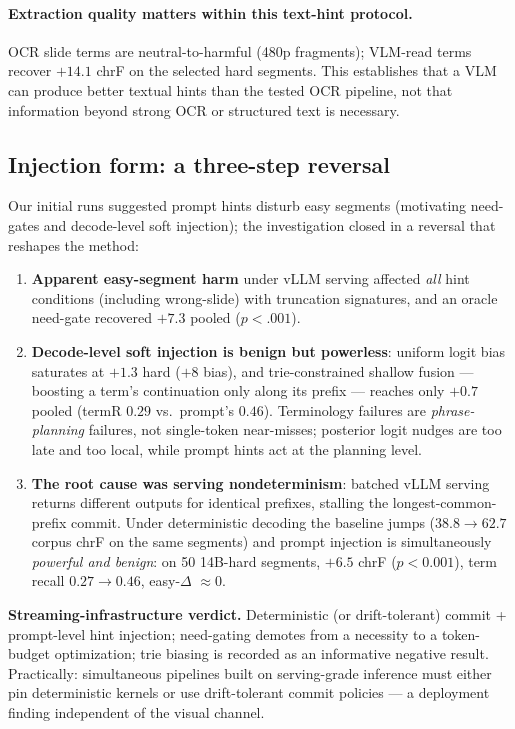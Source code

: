 \paragraph{Extraction quality matters within this text-hint protocol.} OCR
slide terms are neutral-to-harmful (480p fragments); VLM-read terms recover
$+14.1$ chrF on the selected hard segments. This establishes that a VLM can
produce better textual hints than the tested OCR pipeline, not that information
beyond strong OCR or structured text is necessary.

\subsection{Injection form: a three-step reversal}
\label{sec:injection-form}

Our initial runs suggested prompt hints disturb easy segments (motivating
need-gates and decode-level soft injection); the investigation closed in a
reversal that reshapes the method:

\begin{enumerate}[leftmargin=*]
\item \textbf{Apparent easy-segment harm} under vLLM serving affected
  \emph{all} hint conditions (including wrong-slide) with truncation
  signatures, and an oracle need-gate recovered $+7.3$ pooled ($p{<}.001$).
\item \textbf{Decode-level soft injection is benign but powerless}: uniform
  logit bias saturates at $+1.3$ hard ($+8$ bias), and trie-constrained
  shallow fusion --- boosting a term's continuation only along its prefix ---
  reaches only $+0.7$ pooled (termR $0.29$ vs.\ prompt's $0.46$).
  Terminology failures are \emph{phrase-planning} failures, not single-token
  near-misses; posterior logit nudges are too late and too local, while prompt
  hints act at the planning level.
\item \textbf{The root cause was serving nondeterminism}: batched vLLM serving
  returns different outputs for identical prefixes, stalling the
  longest-common-prefix commit. Under deterministic decoding the baseline
  jumps ($38.8\!\rightarrow\!62.7$ corpus chrF on the same segments) and
  prompt injection is simultaneously \emph{powerful and benign}: on 50
  14B-hard segments, $+6.5$ chrF ($p{<}0.001$), term recall
  $0.27\!\rightarrow\!0.46$, easy-$\Delta$ $\approx 0$.
\end{enumerate}

\noindent\textbf{Streaming-infrastructure verdict.} Deterministic (or drift-tolerant)
commit + prompt-level hint injection; need-gating demotes from a necessity to
a token-budget optimization; trie biasing is recorded as an informative
negative result. Practically: simultaneous pipelines built on serving-grade
inference must either pin deterministic kernels or use drift-tolerant commit
policies --- a deployment finding independent of the visual channel.

